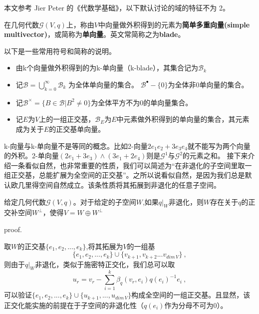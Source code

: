 

\begin{issues}
\issueTODO
\end{issues}

本文参考 Jier Peter 的《代数学基础》，以下默认讨论的域的特征不为 2。

\begin{definition}{}
在几何代数$\mathcal G(V,q)$上，称由$V$中向量做外积得到的元素为\textbf{简单多重向量(simple multivector)}，或简称为\textbf{单向量}。英文常简称之为\textbf{blade}。

以下是一些常用符号和简称的说明。
\begin{itemize}
\item 由k个向量做外积得到的为k-单向量（k-blade），其集合记为$\mathcal B_k$
\item 记$\mathcal B=\bigcup \limits ^{\infty}_{k=0}\mathcal B_k$
为全体单向量的集合。
$\mathcal B^{\bullet}-\{0\}$为全体非0单向量的集合。
\item 记$\mathcal B^{\times}=\{B\in\mathcal B|B^2\neq0\}$为全体平方不为0的单向量集合。
\item 记$E$为$V$上的一组正交基，$\mathcal B_E$为$E$中元素做外积得到的单向量的集合，其元素成为关于$E$的正交基单向量。
\end{itemize}
\end{definition}
k-向量与k-单向量不是等同的概念。比如2-向量$2e_1e_2+3e_3e_4$就不能写为两个向量的外积。2-单向量$(2e_1+3e_3)\wedge(3e_1+2e_4)$则是$\mathcal G^1$与$\mathcal G^2$的元素之和。
接下来介绍一条看似自然，也非常重要的性质，我们可以简述为“在非退化的子空间里取一组正交基，总能扩展为全空间的正交基”。之所以说看似自然，是因为我们总是默认欧几里得空间自然成立。该条性质将其拓展到非退化的任意子空间。
\begin{theorem}{}
给定几何代数$\mathcal G(V,q)$。对于给定的子空间$W$,如果$q|_W$非退化，则$W$存在关于$q$的正交补空间$W^{\bot}$，使得$V=W\oplus W^{\bot}$
\end{theorem}

proof.

取$W$的正交基$\{e_1,e_2,...,e_k\}$,将其拓展为$V$的一组基
\begin{equation}
\{e_1,e_2,...,e_k\}\cup\{v_{k+1},v_{k+2}...v_{dim \,V}\}~,
\end{equation}
则由于$q|_W$非退化，类似于施密特正交化，我们总可以取
\begin{equation}
u_r=v_r-\sum ^{k}_{i=1}\beta_q(v_r,e_i)q(e_i)^{-1}e_i~,
\end{equation}
可以验证$\{e_1,e_2,...,e_k\}\cup\{u_{k+1},...,u_{dim\,V}\}$构成全空间的一组正交基。且显然，该正交化能实施的前提在于子空间的非退化性（$q(e_i)$作为分母不可为$0$）。

